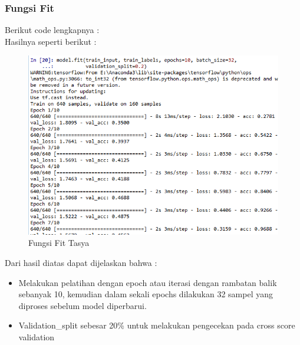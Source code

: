 \subsubsection{Fungsi Fit}
Berikut code lengkapnya :\\

Hasilnya seperti berikut :\\
\begin{figure}[ht]
\centering
\includegraphics[scale=0.5]{figures/chapter6tasya19.png}
\caption{Fungsi Fit Tasya}
\label{Praktek}
\end{figure}
Dari hasil diatas dapat dijelaskan bahwa :\\
\begin{itemize}
\item Melakukan pelatihan dengan epoch atau iterasi dengan rambatan balik sebanyak 10, kemudian dalam sekali epochs dilakukan 32  sampel yang diproses sebelum model diperbarui.
\item Validation\_split sebesar 20\% untuk melakukan pengecekan pada cross score validation
\end{itemize}

